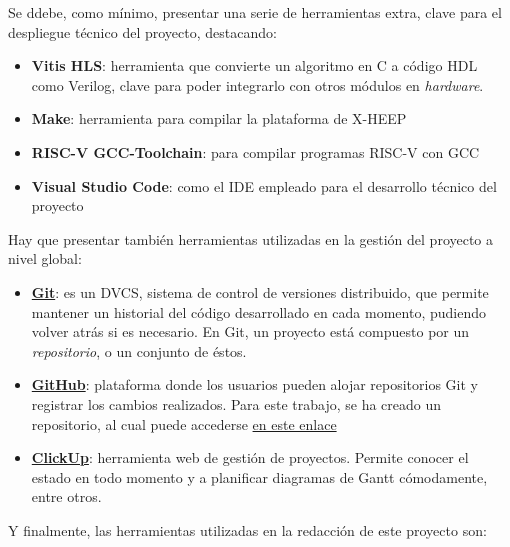 Se ddebe, como mínimo, presentar una serie de herramientas extra, clave para el despliegue técnico del proyecto, destacando:

\begin{itemize}
    \item \textbf{Vitis HLS}: \cite{vitisHLSInfo} herramienta que convierte un algoritmo en C a código HDL como Verilog, clave para poder integrarlo con otros módulos en \textit{hardware}. 
    \item \textbf{Make}\cite{makeInfo}: herramienta para compilar la plataforma de X-HEEP
    \item \textbf{RISC-V GCC-Toolchain}\cite{gccRISCVInfo}: para compilar programas RISC-V con \ac{GCC}
    \item \textbf{Visual Studio Code}\cite{vscodeInfo}: como el \ac{IDE} empleado para el desarrollo técnico del proyecto
\end{itemize}

Hay que presentar también herramientas utilizadas en la gestión del proyecto a nivel global:

\begin{itemize}
    \item \textbf{\href{https://git-scm.com/downloads}{Git}}: es un \ac{DVCS}, sistema de control de versiones distribuido, que permite mantener un historial del código desarrollado en cada momento, pudiendo volver atrás si es necesario. En Git, un proyecto está compuesto por un \emph{repositorio}, o un conjunto de éstos.
    \item \textbf{\href{https://github.com/}{GitHub}}: plataforma donde los usuarios pueden alojar repositorios Git y registrar los cambios realizados. Para este trabajo, se ha creado un repositorio, al cual puede accederse \href{https://github.com/fluctlights/perte-tfm} {en este enlace}
    \item \textbf{\href{https://clickup.com/}{ClickUp}}: herramienta web de gestión de proyectos. Permite conocer el estado en todo momento y a planificar diagramas de Gantt cómodamente, entre otros.
\end{itemize}

Y finalmente, las herramientas utilizadas en la redacción de este proyecto son:

